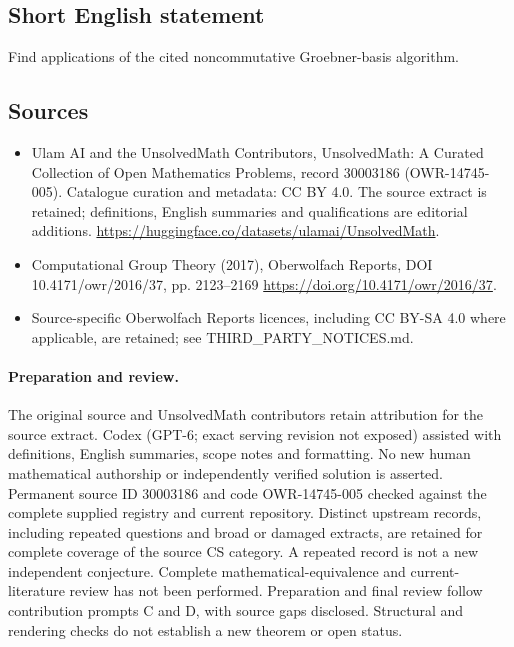 \documentclass[11pt]{article}
\begin{document}
\subsection{Short English statement}
Find applications of the cited noncommutative Groebner-basis algorithm.
\subsection{Sources}
\begin{itemize}
\item[\hypertarget{source:30003186:1}{S1}] Ulam AI and the UnsolvedMath Contributors, UnsolvedMath: A Curated Collection of Open Mathematics Problems, record 30003186 (OWR-14745-005). Catalogue curation and metadata: CC BY 4.0. The source extract is retained; definitions, English summaries and qualifications are editorial additions.
\url{https://huggingface.co/datasets/ulamai/UnsolvedMath}.
\item[\hypertarget{source:30003186:2}{S2}] Computational Group Theory (2017), Oberwolfach Reports, DOI 10.4171/owr/2016/37, pp. 2123--2169
\url{https://doi.org/10.4171/owr/2016/37}.
\item Source-specific Oberwolfach Reports licences, including CC BY-SA 4.0 where applicable, are retained; see THIRD\_PARTY\_NOTICES.md.
\end{itemize}
\paragraph{Preparation and review.}
The original source and UnsolvedMath contributors retain attribution for the source extract. Codex (GPT-6; exact serving revision not exposed) assisted with definitions, English summaries, scope notes and formatting. No new human mathematical authorship or independently verified solution is asserted. Permanent source ID 30003186 and code OWR-14745-005 checked against the complete supplied registry and current repository. Distinct upstream records, including repeated questions and broad or damaged extracts, are retained for complete coverage of the source CS category. A repeated record is not a new independent conjecture. Complete mathematical-equivalence and current-literature review has not been performed. Preparation and final review follow contribution prompts C and D, with source gaps disclosed. Structural and rendering checks do not establish a new theorem or open status.
\label{end:30003186}
\end{document}
